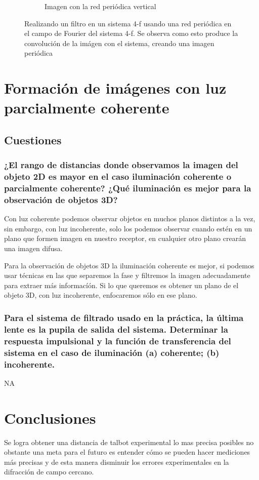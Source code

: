 \documentclass{./packages/optica-article}
\begin{document}
\begin{figure}[hptb]
\begin{center}
\begin{subfigure}[t]{0.3\textwidth}
			\caption{Imagen con la red periódica vertical}
			\label{fig:filtrado:talbot:3}
		\end{subfigure}
		\caption{Realizando un filtro en un sistema 4-f usando una red periódica en el campo de Fourier del sistema 4-f. Se observa como esto produce la convolución de la imágen con el sistema, creando una imagen periódica}
		\label{fig:filtrado:all}
	\end{center}
\end{figure}



\section{Formación de imágenes con luz parcialmente coherente}

\subsection{Cuestiones}
\subsubsection{¿El rango de distancias donde observamos la imagen del objeto 2D es mayor en el caso iluminación coherente o parcialmente coherente? ¿Qué iluminación es mejor para la observación de objetos 3D?}

Con luz coherente podemos observar objetos en muchos planos distintos a la vez, sin embargo, con luz incoherente, solo los podemos observar cuando estén en un plano que formen imagen en nuestro receptor, en cualquier otro plano crearán una imagen difusa.

Para la observación de objetos 3D la iluminación coherente es mejor, si podemos usar técnicas en las que separemos la fase y filtremos la imagen adecuadamente para extraer más informacíón. Si lo que queremos es obtener un plano de el objeto 3D, con luz incoherente, enfocaremos sólo en ese plano.

\subsubsection{Para el sistema de filtrado usado en la práctica, la última lente es la pupila de salida del sistema. Determinar la respuesta impulsional y la función de transferencia del sistema en el caso de iluminación (a) coherente; (b) incoherente.}

NA

\section{Conclusiones}
Se logra obtener una distancia de talbot experimental lo mas precisa posibles no obstante  una meta para el futuro es entender cómo se pueden hacer mediciones más precisas y de esta manera disminuir los errores experimentales en la difracción de campo cercano.


\end{document}

